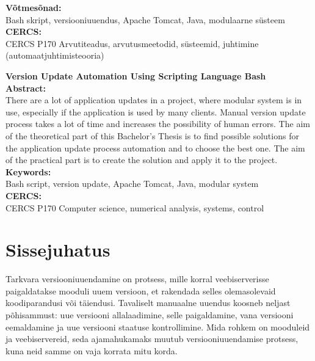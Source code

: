 \documentclass[12pt]{article}
\renewcommand{\headrulewidth}{0pt}
\begin{document}
  \noindent\textbf{Võtmesõnad:}\\
  Bash skript, versiooniuuendus, Apache Tomcat, Java, modulaarne süsteem\\
  
  \noindent\textbf{CERCS:}\\
  CERCS P170 Arvutiteadus, arvutusmeetodid, süsteemid, juhtimine (automaatjuhtimisteooria)
  \vspace{2cm}

  \noindent\textbf{Version Update Automation Using Scripting Language Bash}\\

  \noindent\textbf{Abstract:}\\
  There are a lot of application updates in a project, where modular system is in use, especially if the application is used by many clients. Manual version update process takes a lot of time and increases the possibility of human errors. The aim of the theoretical part of this Bachelor's Thesis is to find possible solutions for the application update process automation and to choose the best one. The aim of the practical part is to create the solution and apply it to the project.\\

  \noindent\textbf{Keywords:}\\
  Bash script, version update, Apache Tomcat, Java, modular system\\
  
  \noindent\textbf{CERCS:}\\
  CERCS P170 Computer science, numerical analysis, systems, control
  
  \newpage
 
  \tableofcontents
  \fancypagestyle{plain}{%
    \renewcommand{\headrulewidth}{0pt}%
    \fancyhf{}%
    \fancyfoot[R]{\thepage}%
  }
 
  \newpage
  
  \section*{Sissejuhatus}
  \label{sissejuhatus}
  
  Tarkvara versiooniuuendamine on protsess, mille korral veebiserverisse paigaldatakse mooduli uuem versioon, et rakendada selles olemasolevaid koodiparandusi või täiendusi. Tavaliselt manuaalne uuendus koosneb neljast põhisammust: uue versiooni allalaadimine, selle paigaldamine, vana versiooni eemaldamine ja uue versiooni staatuse kontrollimine. Mida rohkem on mooduleid ja veebiservereid, seda ajamahukamaks muutub versiooniuuendamise protsess, kuna neid samme on vaja korrata mitu korda.
  
\end{document}
